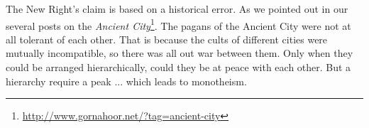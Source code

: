 \begin{footnotesize}
\begin{sffamily}
The New Right's claim is based on a historical error. As we pointed out in our several posts on the
\textit{Ancient City}\footnote{\url{http://www.gornahoor.net/?tag=ancient-city}}. The pagans of the Ancient City were not at all tolerant of each other. That is because the cults of different cities were mutually incompatible, so there was all out war between them. Only when they could be arranged hierarchically, could they be at peace with each other. But a hierarchy require a peak ... which leads to monotheism.

\end{sffamily}
\end{footnotesize}

